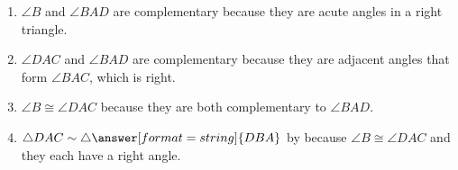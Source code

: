 \documentclass[nooutcomes]{ximera}
\begin{document}
\begin{problem}
\begin{enumerate}
\item $\angle B$ and $\angle BAD$ are complementary because they are acute angles in a right triangle. 

\item $\angle DAC$ and $\angle BAD$ are complementary because they are adjacent angles that form $\angle BAC$, which is right.  

\item $\angle B \cong \angle DAC$ because they are both complementary to $\angle BAD$.  

\item $\triangle DAC\sim \triangle \answer[format=string]{DBA}$ by  because $\angle B \cong \angle DAC$ and they each have a right angle.
\end{enumerate}

\end{problem}
\end{document}
